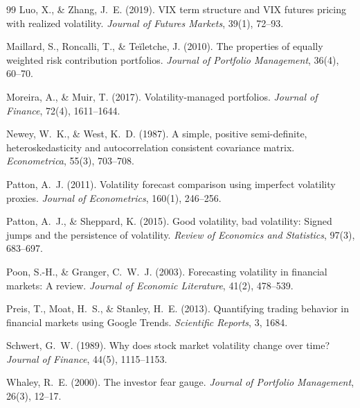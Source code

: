 \documentclass[12pt,a4paper]{article}
\begin{document}
\begin{thebibliography}{99}
Luo, X., \& Zhang, J.~E. (2019). VIX term structure and VIX futures pricing with realized volatility. \textit{Journal of Futures Markets}, 39(1), 72--93.

Maillard, S., Roncalli, T., \& Te\"{i}letche, J. (2010). The properties of equally weighted risk contribution portfolios. \textit{Journal of Portfolio Management}, 36(4), 60--70.

Moreira, A., \& Muir, T. (2017). Volatility-managed portfolios. \textit{Journal of Finance}, 72(4), 1611--1644.

Newey, W.~K., \& West, K.~D. (1987). A simple, positive semi-definite, heteroskedasticity and autocorrelation consistent covariance matrix. \textit{Econometrica}, 55(3), 703--708.

Patton, A.~J. (2011). Volatility forecast comparison using imperfect volatility proxies. \textit{Journal of Econometrics}, 160(1), 246--256.

Patton, A.~J., \& Sheppard, K. (2015). Good volatility, bad volatility: Signed jumps and the persistence of volatility. \textit{Review of Economics and Statistics}, 97(3), 683--697.

Poon, S.-H., \& Granger, C.~W.~J. (2003). Forecasting volatility in financial markets: A review. \textit{Journal of Economic Literature}, 41(2), 478--539.

Preis, T., Moat, H.~S., \& Stanley, H.~E. (2013). Quantifying trading behavior in financial markets using Google Trends. \textit{Scientific Reports}, 3, 1684.

Schwert, G.~W. (1989). Why does stock market volatility change over time? \textit{Journal of Finance}, 44(5), 1115--1153.

Whaley, R.~E. (2000). The investor fear gauge. \textit{Journal of Portfolio Management}, 26(3), 12--17.

\end{thebibliography}
\end{document}

